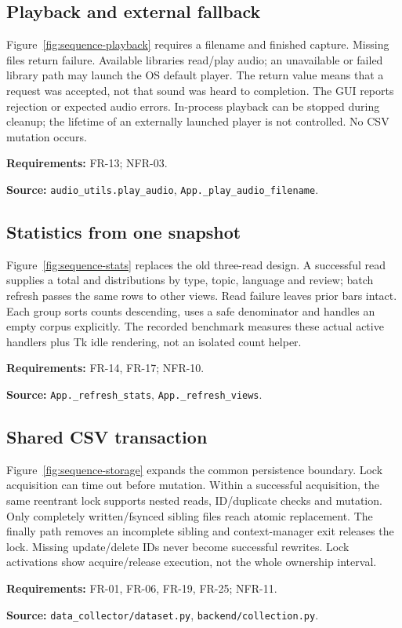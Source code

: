 \documentclass[11pt,a4paper]{article}
\newcommand{\viewtrace}[2]{\par\smallskip\noindent\textbf{Requirements:} #1.\par
  \noindent\textbf{Source:} #2.\par\medskip}
\begin{document}
\subsection{Playback and external fallback}
Figure~\ref{fig:sequence-playback} requires a filename and finished capture.
Missing files return failure. Available libraries read/play audio; an unavailable
or failed library path may launch the OS default player. The return value means
that a request was accepted, not that sound was heard to completion.
The GUI reports rejection or expected audio errors. In-process playback can
be stopped during cleanup; the lifetime of an externally launched player is
not controlled. No CSV mutation occurs.
\viewtrace{FR-13; NFR-03}{\nolinkurl{audio_utils.play_audio}, \nolinkurl{App._play_audio_filename}}

\subsection{Statistics from one snapshot}
Figure~\ref{fig:sequence-stats} replaces the old three-read design. A successful
read supplies a total and distributions by type, topic, language and review; batch refresh
passes the same rows to other views. Read failure leaves prior bars intact.
Each group sorts counts descending, uses a safe denominator and handles an
empty corpus explicitly. The recorded benchmark measures these actual active
handlers plus Tk idle rendering, not an isolated count helper.
\viewtrace{FR-14, FR-17; NFR-10}{\nolinkurl{App._refresh_stats}, \nolinkurl{App._refresh_views}}

\subsection{Shared CSV transaction}
Figure~\ref{fig:sequence-storage} expands the common persistence boundary.
Lock acquisition can time out before mutation. Within a successful acquisition,
the same reentrant lock supports nested reads, ID/duplicate checks and mutation.
Only completely written/fsynced sibling files reach atomic replacement.
The finally path removes an incomplete sibling and context-manager exit releases
the lock. Missing update/delete IDs never become successful rewrites.
Lock activations show acquire/release execution, not the whole ownership interval.
\viewtrace{FR-01, FR-06, FR-19, FR-25; NFR-11}{\nolinkurl{data_collector/dataset.py}, \nolinkurl{backend/collection.py}}
\end{document}
